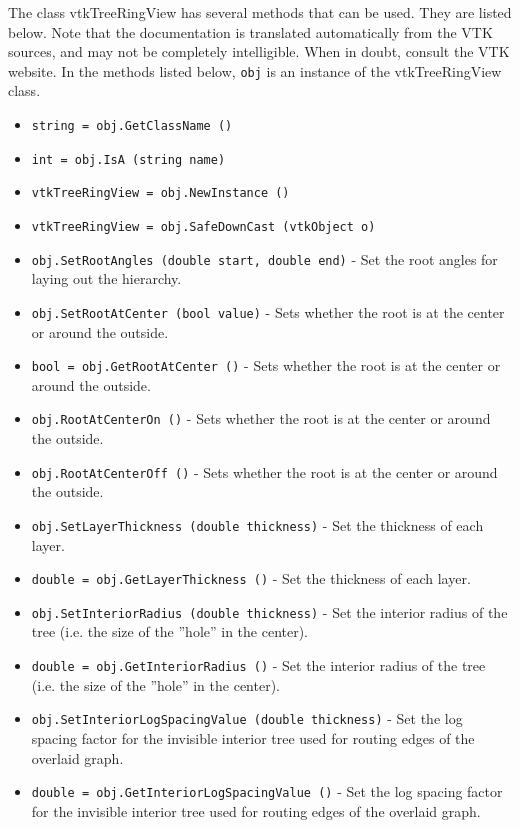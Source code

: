 The class vtkTreeRingView has several methods that can be used.
  They are listed below.
Note that the documentation is translated automatically from the VTK sources,
and may not be completely intelligible.  When in doubt, consult the VTK website.
In the methods listed below, \verb|obj| is an instance of the vtkTreeRingView class.
\begin{itemize}
\item  \verb|string = obj.GetClassName ()|

\item  \verb|int = obj.IsA (string name)|

\item  \verb|vtkTreeRingView = obj.NewInstance ()|

\item  \verb|vtkTreeRingView = obj.SafeDownCast (vtkObject o)|

\item  \verb|obj.SetRootAngles (double start, double end)| -  Set the root angles for laying out the hierarchy.

\item  \verb|obj.SetRootAtCenter (bool value)| -  Sets whether the root is at the center or around the outside.

\item  \verb|bool = obj.GetRootAtCenter ()| -  Sets whether the root is at the center or around the outside.

\item  \verb|obj.RootAtCenterOn ()| -  Sets whether the root is at the center or around the outside.

\item  \verb|obj.RootAtCenterOff ()| -  Sets whether the root is at the center or around the outside.

\item  \verb|obj.SetLayerThickness (double thickness)| -  Set the thickness of each layer.

\item  \verb|double = obj.GetLayerThickness ()| -  Set the thickness of each layer.

\item  \verb|obj.SetInteriorRadius (double thickness)| -  Set the interior radius of the tree
 (i.e. the size of the ''hole'' in the center).

\item  \verb|double = obj.GetInteriorRadius ()| -  Set the interior radius of the tree
 (i.e. the size of the ''hole'' in the center).

\item  \verb|obj.SetInteriorLogSpacingValue (double thickness)| -  Set the log spacing factor for the invisible interior tree
 used for routing edges of the overlaid graph.

\item  \verb|double = obj.GetInteriorLogSpacingValue ()| -  Set the log spacing factor for the invisible interior tree
 used for routing edges of the overlaid graph.

\end{itemize}
